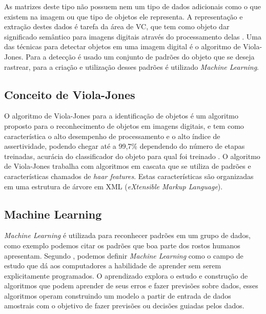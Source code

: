 As matrizes deste tipo não possuem nem um tipo de dados adicionais como o que existem na imagem ou que tipo de objetos ele representa. A representação e extração destes dados é tarefa da área de VC, que tem como objeto dar significado semântico para imagens digitais através do processamento delas \cite{prince2012computer}. Uma das técnicas para detectar objetos em uma imagem digital é o algoritmo de Viola-Jones. Para a detecção é usado um conjunto de padrões do objeto que se deseja rastrear, para a criação e utilização desses padrões é utilizado \textit{Machine Learning}.

\subsection{Conceito de Viola-Jones}

O algoritmo de Viola-Jones para a identificação de objetos é um algoritmo proposto para o reconhecimento de objetos em imagens digitais, e tem como característica o alto desempenho de processamento e o alto índice de assertividade, podendo chegar até a 99,7\% dependendo do número de etapas treinadas, acurácia do classificador do objeto para qual foi treinado \cite{viola2001rapid}. O algoritmo de Viola-Jones trabalha com algoritmos em cascata que se utiliza de padrões e características chamados de \textit{haar features}. Estas características são organizadas em uma estrutura de árvore em XML (\textit{eXtensible Markup Language}).

\subsection{Machine Learning}


\textit{Machine Learning} é utilizada para reconhecer padrões em um grupo de dados, como exemplo podemos citar os padrões que boa parte dos rostos humanos apresentam. Segundo , podemos definir \textit{Machine Learning} como o campo de estudo que dá aos computadores a habilidade de aprender sem serem explicitamente programados. O aprendizado explora o estudo e construção de algoritmos que podem aprender de seus erros e fazer previsões sobre dados, esses algoritmos operam construindo um modelo a partir de entrada de dados amostrais com o objetivo de fazer previsões ou decisões guiadas pelos dados.

